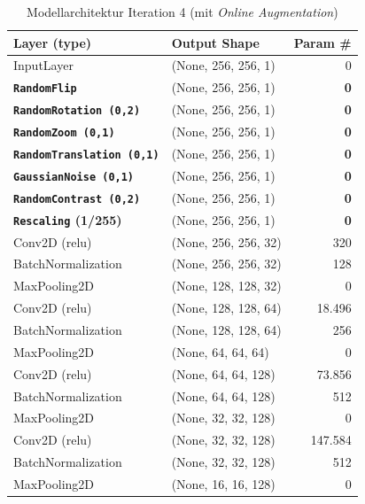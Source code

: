 \documentclass[
    a4paper,        %
    11pt,           %
    ngerman,        %
    parskip=half,   %
    listof=totoc,   %
    bibliography=totoc %
]{scrartcl}
\begin{document}
\begin{table}[H]
    \centering
    \caption{Modellarchitektur Iteration 4 (mit \textit{Online Augmentation})}
    \label{tab:model_summary_iter4}
    \begin{tabular}{llr}
        \toprule
        \textbf{Layer (type)} & \textbf{Output Shape} & \textbf{Param \#} \\
        \midrule
        InputLayer & (None, 256, 256, 1) & 0 \\
        \textbf{\texttt{RandomFlip}} & (None, 256, 256, 1) & \textbf{0} \\
        \textbf{\texttt{RandomRotation (0,2)}} & (None, 256, 256, 1) & \textbf{0} \\
        \textbf{\texttt{RandomZoom (0,1)}} & (None, 256, 256, 1) & \textbf{0} \\
        \textbf{\texttt{RandomTranslation (0,1)}} & (None, 256, 256, 1) & \textbf{0} \\
        \textbf{\texttt{GaussianNoise (0,1)}} & (None, 256, 256, 1) & \textbf{0} \\
        \textbf{\texttt{RandomContrast (0,2)}} & (None, 256, 256, 1) & \textbf{0} \\
        \textbf{\texttt{Rescaling} (1/255)} & (None, 256, 256, 1) & \textbf{0} \\
        Conv2D (relu) & (None, 256, 256, 32) & 320 \\
        BatchNormalization & (None, 256, 256, 32) & 128 \\
        MaxPooling2D & (None, 128, 128, 32) & 0 \\
        Conv2D (relu) & (None, 128, 128, 64) & 18.496 \\
        BatchNormalization & (None, 128, 128, 64) & 256 \\
        MaxPooling2D & (None, 64, 64, 64) & 0 \\
        Conv2D (relu) & (None, 64, 64, 128) & 73.856 \\
        BatchNormalization & (None, 64, 64, 128) & 512 \\
        MaxPooling2D & (None, 32, 32, 128) & 0 \\
        Conv2D (relu) & (None, 32, 32, 128) & 147.584 \\
        BatchNormalization & (None, 32, 32, 128) & 512 \\
        MaxPooling2D & (None, 16, 16, 128) & 0 \\

\end{tabular}
\end{table}
\end{document}
